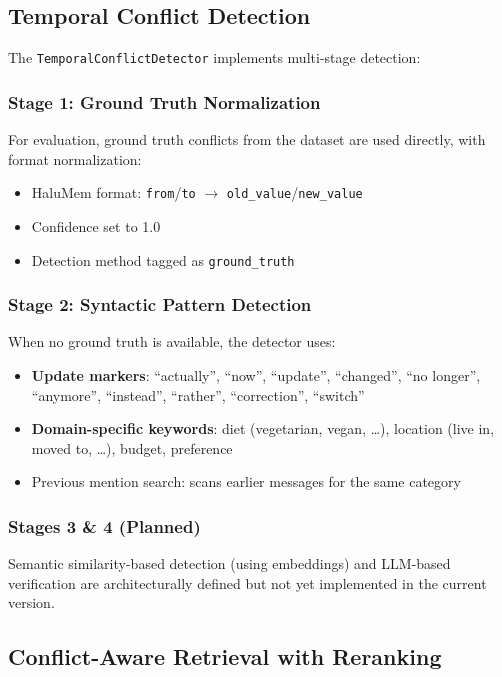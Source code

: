 \documentclass[11pt,a4paper]{article}
\begin{document}
\subsection{Temporal Conflict Detection}

The \texttt{TemporalConflictDetector} implements multi-stage detection:

\subsubsection{Stage 1: Ground Truth Normalization}
For evaluation, ground truth conflicts from the dataset are used directly, with format normalization:
\begin{itemize}
    \item HaluMem format: \texttt{from}/\texttt{to} $\rightarrow$ \texttt{old\_value}/\texttt{new\_value}
    \item Confidence set to 1.0
    \item Detection method tagged as \texttt{ground\_truth}
\end{itemize}

\subsubsection{Stage 2: Syntactic Pattern Detection}
When no ground truth is available, the detector uses:
\begin{itemize}
    \item \textbf{Update markers}: ``actually'', ``now'', ``update'', ``changed'', ``no longer'', ``anymore'', ``instead'', ``rather'', ``correction'', ``switch''
    \item \textbf{Domain-specific keywords}: diet (vegetarian, vegan, \ldots), location (live in, moved to, \ldots), budget, preference
    \item Previous mention search: scans earlier messages for the same category
\end{itemize}

\subsubsection{Stages 3 \& 4 (Planned)}
Semantic similarity-based detection (using embeddings) and LLM-based verification are architecturally defined but not yet implemented in the current version.

\subsection{Conflict-Aware Retrieval with Reranking}
\end{document}
